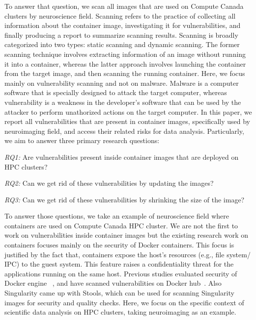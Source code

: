 \documentclass[a4paper,num-refs]{oup-contemporary}
\begin{document}
To answer that question, we scan all images that are used on Compute
Canada clusters by neuroscience field. Scanning refers to the practice of
collecting all information about the container image, investigating it
for vulnerabilities, and finally producing a
report to summarize scanning results. Scanning is broadly categorized into
two types: static scanning and dynamic scanning. The former scanning technique
involves extracting information of an image without running it into a container,
whereas the latter approach involves launching the container from the target image, and
then scanning the running container.
Here, we focus mainly on vulnerability scanning and not on malware.
Malware is a computer software that is specially designed to attack the target computer,
whereas vulnerability is a weakness in the developer's software that can be used
by the attacker to perform unathorized actions on the target computer.
In this paper, we report all vulnerabilities that are present in
container images, specifically used by neuroimaging field, and access their
related risks for data analysis. Particularly, we aim to answer three primary
research questions:

\textit{RQ1:} Are vulnerabilities present inside container images that are
deployed on HPC clusters?

\textit{RQ2:} Can we get rid of these vulnerabilities by updating the
images?

\textit{RQ3:} Can we get rid of these vulnerabilities by shrinking the
size of the image?

To answer those questions, we take an example of neuroscience field where
containers are used on Compute Canada HPC cluster.
We are not the first to work on vulnerabilities inside container images but
the existing research work on containers focuses mainly on the security of Docker
containers.
This focus is justified by the fact that, containers expose the host's resources
(e.g., file system/ IPC) to the guest system. This feature raises a confidentiality
threat for the applications running on the same host. Previous studies evaluated
security of Docker engine ~\cite{martin2018docker, sultan2019container, combe2016docker, bui2015analysis},
and have scanned vulnerabilities on Docker hub~\cite{Shu2017, gummaraju2015over}.
Also Singularity came up with Stools, which can be used for scanning Singularity images
for security and quality checks.
Here, we focus on the specific context of scientific data analysis on HPC clusters, taking
neuroimaging as an example.
\end{document}
